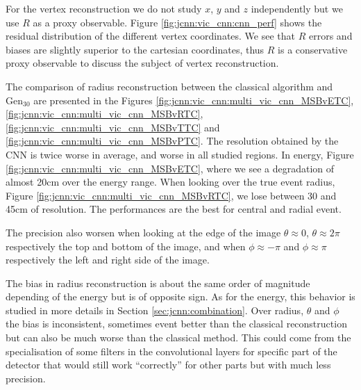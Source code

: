 \documentclass[../main.tex]{subfiles}
\begin{document}
For the vertex reconstruction we do not study $x$, $y$ and $z$ independently but we use $R$ as a proxy observable. Figure \ref{fig:jcnn:vic_cnn:cnn_perf} shows the residual distribution of the different vertex coordinates. We see that $R$ errors and biases are slightly superior to the cartesian coordinates, thus $R$ is a conservative proxy observable to discuss the subject of vertex reconstruction.

The comparison of radius reconstruction between the classical algorithm and $\mathrm{Gen}_{30}$ are presented in the Figures \ref{fig:jcnn:vic_cnn:multi_vic_cnn_MSBvETC}, \ref{fig:jcnn:vic_cnn:multi_vic_cnn_MSBvRTC}, \ref{fig:jcnn:vic_cnn:multi_vic_cnn_MSBvTTC} and \ref{fig:jcnn:vic_cnn:multi_vic_cnn_MSBvPTC}. The resolution obtained by the CNN is twice worse in average, and worse in all studied regions.
In energy, Figure \ref{fig:jcnn:vic_cnn:multi_vic_cnn_MSBvETC}, where we see a degradation of almost 20cm over the energy range.
When looking over the true event radius, Figure \ref{fig:jcnn:vic_cnn:multi_vic_cnn_MSBvRTC}, we lose between 30 and 45cm of resolution. The performances are the best for central and radial event.

The precision also worsen when looking at the edge of the image $\theta \approx 0$, $\theta \approx 2\pi$ respectively the top and bottom of the image, and when $\phi \approx -\pi$ and $\phi \approx \pi$ respectively the left and right side of the image.

The bias in radius reconstruction is about the same order of magnitude depending of the energy but is of opposite sign. As for the energy, this behavior is studied in more details in Section \ref{sec:jcnn:combination}. Over radius, $\theta$ and $\phi$ the bias is inconsistent, sometimes event better than the classical reconstruction but can also be much worse than the classical method. This could come from the specialisation of some filters in the convolutional layers for specific part of the detector that would still work ``correctly'' for other parts but with much less precision.
\end{document}
